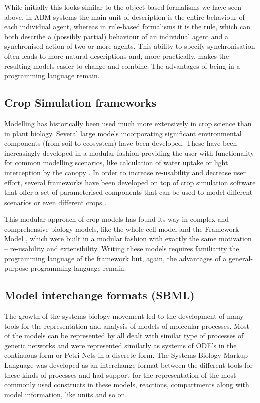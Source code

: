 While initially this looks similar to the object-based formalisms we have seen
above, in ABM systems the main unit of description is the entire behaviour of
each individual agent, whereas in rule-based formalisms it is the rule, which
can both describe a (possibly partial) behaviour of an individual agent and a
synchronised action of two or more agents. This ability to specify
synchronisation often leads to more natural descriptions and, more practically,
makes the resulting models easier to change and combine. The advantages of being
in a programming language remain.

\subsection{Crop Simulation frameworks}
Modelling has historically been used much more extensively in crop science than
in plant biology. Several large models incorporating significant environmental
components (from soil to ecosystem) have been developed. These have been
increasingly developed in a modular fashion providing the user with
functionality for common modelling scenarios, like calculation of water uptake
or light interception by the canopy \citep{keating_overview_2003}. In order to
increase re-usability and decrease user effort, several frameworks have been
developed on top of crop simulation software that offer a set of parameterised
components that can be used to model different scenarios or even different crops
\citep{brown_plant_2014}.

This modular approach of crop models has found its way in complex and
comprehensive biology models, like the \citet{karr_whole-cell_2012} whole-cell
model and the Framework Model \citep{chew2014multiscale}, which were built in a
modular fashion with exactly the same motivation -- re-usability and
extensibility. Writing these models requires familiarity the programming
language of the framework but, again, the advantages of a general-purpose
programming language remain.


\subsection{Model interchange formats (SBML)}
The growth of the systems biology movement led to the development of many tools
for the representation and analysis of models of molecular processes. Most of
the models can be represented by all dealt with similar type of processes of
genetic networks and were represented similarly as systems of ODE's in the
continuous form or Petri Nets in a discrete form. The Systems Biology Markup
Language \citep[SMBL;][]{hucka_systems_2003} was developed as an interchange
format between the different tools for these kinds of processes and had support
for the representation of the most commonly used constructs in these models,
reactions, compartments along with model information, like units and so on.

